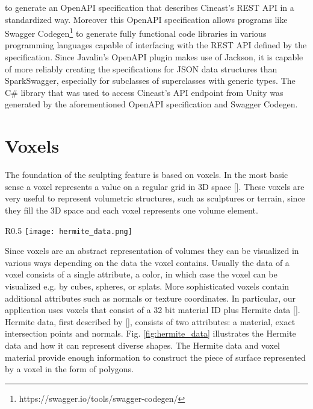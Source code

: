 to generate an OpenAPI specification that describes Cineast's REST API in a standardized way. Moreover this OpenAPI specification allows programs like Swagger Codegen\footnote{https://swagger.io/tools/swagger-codegen/} to generate
fully functional code libraries in various programming languages capable of interfacing with the REST API defined by the specification. Since Javalin's OpenAPI plugin makes use of Jackson, it is capable of more reliably creating the specifications for JSON data structures than SparkSwagger, especially for subclasses of superclasses with generic types. The C\# library that was used to access Cineast's API endpoint from Unity was generated by the aforementioned OpenAPI
specification and Swagger Codegen.

\section{Voxels}

The foundation of the sculpting feature is based on voxels. In the most basic sense a voxel represents a value on a regular grid
in 3D space []. These voxels are very useful to represent volumetric structures, such as sculptures
or terrain, since they fill the 3D space and each voxel represents one volume element.

\begin{wrapfigure}{R}{0.5\textwidth}
\texttt{[image: hermite\_data.png]}
\caption{Hermite data.}
\label{fig:hermite_data}
\end{wrapfigure}

Since voxels are an abstract representation of volumes they can be visualized in various ways depending on the data the voxel contains.
Usually the data of a voxel consists of a single attribute, a color, in which case the voxel can be visualized e.g. by cubes, spheres, or splats.
More sophisticated voxels contain additional attributes such as normals or texture coordinates. In particular, our application uses voxels that
consist of a 32 bit material ID plus Hermite data []. Hermite data, first described by [],
consists of two attributes: a material, exact intersection points and normals. Fig. \ref{fig:hermite_data} illustrates the Hermite data and how it can represent
diverse shapes. The Hermite data and voxel material provide enough information to construct the piece of surface represented by a voxel in the form of polygons.

